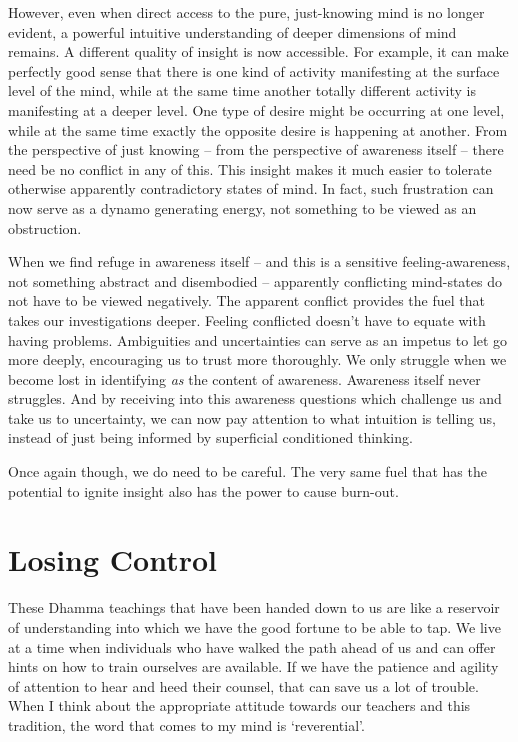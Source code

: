 However, even when direct access to the pure, just-knowing mind is no
longer evident, a powerful intuitive understanding of deeper dimensions
of mind remains. A different quality of insight is now accessible. For
example, it can make perfectly good sense that there is one kind of
activity manifesting at the surface level of the mind, while at the same
time another totally different activity is manifesting at a deeper
level. One type of desire might be occurring at one level, while at the
same time exactly the opposite desire is happening at another. From the
perspective of just knowing – from the perspective of awareness itself –
there need be no conflict in any of this. This insight makes it much
easier to tolerate otherwise apparently contradictory states of mind. In
fact, such frustration can now serve as a dynamo generating energy, not
something to be viewed as an obstruction.

When we find refuge in awareness itself – and this is a sensitive
feeling-awareness, not something abstract and disembodied – apparently
conflicting mind-states do not have to be viewed negatively. The
apparent conflict provides the fuel that takes our investigations
deeper. Feeling conflicted doesn’t have to equate with having problems.
Ambiguities and uncertainties can serve as an impetus to let go more
deeply, encouraging us to trust more thoroughly. We only struggle when
we become lost in identifying \emph{as} the content of awareness. Awareness
itself never struggles. And by receiving into this awareness questions
which challenge us and take us to uncertainty, we can now pay attention
to what intuition is telling us, instead of just being informed by
superficial conditioned thinking.

Once again though, we do need to be careful. The very same fuel that has
the potential to ignite insight also has the power to cause burn-out.

\section{Losing Control}

These Dhamma teachings that have been handed down to us are like a
reservoir of understanding into which we have the good fortune to be
able to tap. We live at a time when individuals who have walked the path
ahead of us and can offer hints on how to train ourselves are available.
If we have the patience and agility of attention to hear and heed their
counsel, that can save us a lot of trouble. When I think about the
appropriate attitude towards our teachers and this tradition, the word
that comes to my mind is ‘reverential’.

